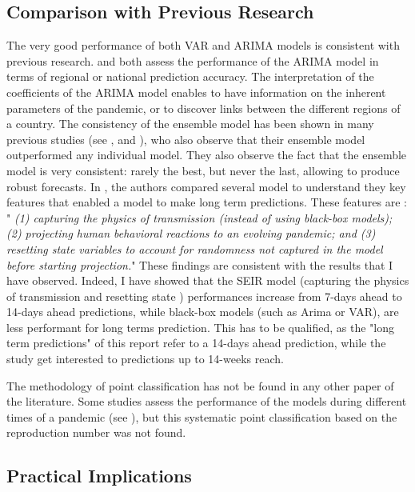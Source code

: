 \subsection{Comparison with Previous Research}

The very good performance of both VAR and ARIMA models is consistent with previous research. 
\cite{kufel2020arima} and \cite{shang2021regional} both assess the performance of the ARIMA model in terms of regional or national prediction accuracy. 
The interpretation of the coefficients of the ARIMA model enables to have information on the inherent parameters of the pandemic, or to discover links between the different regions of a country. 
The consistency of the ensemble model has been shown in many previous studies (see \cite{cramer2022evaluation}, \cite{VIBOUD201813} and \cite{reich2019accuracy}), who also observe that their ensemble model outperformed any individual model. 
They also observe the fact that the ensemble model is very consistent: rarely the best, but never the last, allowing to produce robust forecasts. 
In \cite{rahmandad2022enhancing}, the authors compared several model to understand they key features that enabled a model to make long term predictions. 
These features are : " \textit{(1) capturing the physics of transmission (instead of using black-box models); (2) projecting human behavioral reactions to an evolving pandemic; and (3) resetting state variables to account for randomness not captured in the model before starting projection.}"
These findings are consistent with the results that I have observed. 
Indeed, I have showed that the SEIR model (capturing the physics of transmission and resetting state ) performances increase from 7-days ahead to 14-days ahead predictions, while black-box models (such as Arima or VAR), are less performant for long terms prediction. 
This has to be qualified, as the "long term predictions" of this report refer to a 14-days ahead prediction, while the study \cite{rahmandad2022enhancing} get interested to predictions up to 14-weeks reach. 

The methodology of point classification has not be found in any other paper of the literature. 
Some studies assess the performance of the models during different times of a pandemic (see \cite{howerton2023evaluation}), but this systematic point classification based on the reproduction number was not found. 

\subsection{Practical Implications}


